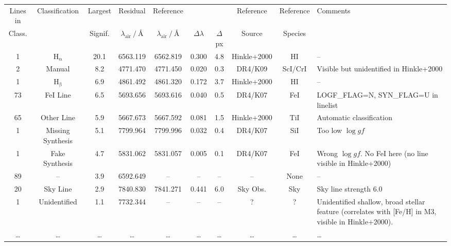 \begin{tabular}{cccccccccp{4.75cm}}
\hline
Lines in & Classification & Largest & Residual                            & Reference                           &                  &            & Reference & Reference & Comments \\
Class.   &                & Signif. & $\lambda_\mathrm{air}~/~\text{\AA}$ & $\lambda_\mathrm{air}~/~\text{\AA}$ & $\Delta \lambda$ & $\Delta$px & Source    & Species   &          \\
\hline
1 & $\mathrm{H_\alpha}$ & 20.1 & 6563.119 & 6562.819 & 0.300 & 4.8 & Hinkle+2000 & HI & -- \\
2 & Manual & 8.2 & 4771.470 & 4771.450 & 0.020 & 0.3 & DR4/K09 & ScI/CrI & Visible but unidentified in Hinkle+2000 \\
1 & $\mathrm{H_\beta}$ & 6.9 & 4861.492 & 4861.320 & 0.172 & 3.7 & Hinkle+2000 & HI & -- \\
73 & FeI Line & 6.5 & 5693.656 & 5693.616 & 0.040 & 0.5 & DR4/K07 & FeI & LOGF\_FLAG=N, SYN\_FLAG=U in linelist \\
65 & Other Line & 5.9 & 5667.673 & 5667.592 & 0.081 & 1.5 & Hinkle+2000 & TiI & Automatic classification \\
1 & Missing Synthesis & 5.1 & 7799.964 & 7799.996 & 0.032 & 0.4 & DR4/K07 & SiI & Too low $\log gf$ \\
1 & Fake Synthesis & 4.7 & 5831.062 & 5831.057 & 0.005 & 0.1 & DR4/K07 & FeI & Wrong $\log gf$. No FeI here (no line visible in Hinkle+2000) \\
89 & -- & 3.9 & 6592.649 & -- & -- & -- & -- & None & -- \\
20 & Sky Line & 2.9 & 7840.830 & 7841.271 & 0.441 & 6.0 & Sky Obs. & Sky & Sky line strength 6.0 \\
1 & Unidentified & 1.1 & 7732.344 & -- & -- & -- & ? & ? & Unidentified shallow, broad stellar feature (correlates with [Fe/H] in M3, visible in Hinkle+2000). \\
\dots & \dots & \dots & \dots & \dots & \dots & \dots & \dots & \dots & \dots \\
\hline
\end{tabular}
